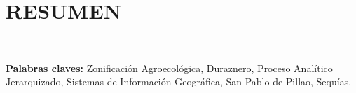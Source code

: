 \chapter*{RESUMEN}
\lipsum[1]

\lipsum[2]\\\vspace{1em}

\textbf{Palabras claves:} Zonificación Agroecológica, Duraznero, Proceso Analítico Jerarquizado, Sistemas de Información Geográfica, San Pablo de Pillao, Sequías.
